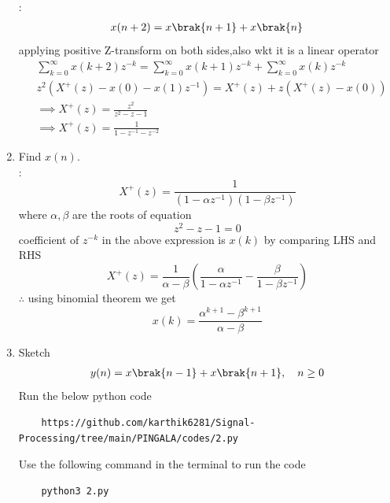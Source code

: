\documentclass[journal,12pt,twocolumn]{IEEEtran}
\renewcommand\thesection{\arabic{section}}
\begin{document}
\begin{enumerate}[label=\thesection.\arabic*,ref=\thesection.\theenumi]
\solution:
\begin{align}
	x(n+2) = x\brak{n+1} + x\brak{n}
\end{align}
applying positive Z-transform on both sides,also wkt it is a linear operator
\begin{align}
	&\sum_{k=0}^{\infty}x(k+2)z^{-k}=\sum_{k=0}^{\infty}x(k+1)z^{-k}+\sum_{k=0}^{\infty}x(k)z^{-k}\\
	&z^{2}(X^{+}(z)-x(0)-x(1)z^{-1})=X^{+}(z)+z(X^{+}(z)-x(0))\\
	&\implies X^{+}(z)=\frac{z^{2}}{z^{2}-z-1}\\
	&\implies X^{+}(z)=\frac{1}{1-z^{-1}-z^{-2}}
\end{align}
\item Find $x(n)$.\\
\solution:
\begin{equation}
	X^{+}(z)=\frac{1}{(1-\alpha z^{-1})(1-\beta z^{-1})}
\end{equation}
where $\alpha,\beta$ are the roots of equation
\begin{equation}
	z^2-z-1=0
\end{equation}
coefficient of $z^{-k}$ in the above expression is $x(k)$ by comparing LHS and RHS\\
\begin{equation}
	X^{+}(z)=\frac{1}{\alpha-\beta}\left(\frac{\alpha}{1-\alpha z^{-1}}-\frac{\beta}{1-\beta z^{-1}}\right)
\end{equation}
$\therefore$ using binomial theorem we get
\begin{equation} 
	x(k)=\frac{\alpha^{k+1}-\beta^{k+1}}{\alpha - \beta}
\end{equation}
\item Sketch 
\begin{align}
	y(n)	 = x\brak{n-1} + x\brak{n+1},  \quad n \ge 0
\end{align}
\solution
Run the below python code 
\begin{lstlisting}
	https://github.com/karthik6281/Signal-Processing/tree/main/PINGALA/codes/2.py
\end{lstlisting}
Use the following command in the terminal to run the code
\begin{lstlisting}
	python3 2.py
\end{lstlisting}
\begin{figure}[h]
	\centering

\end{figure}
\end{enumerate}
\end{document}
